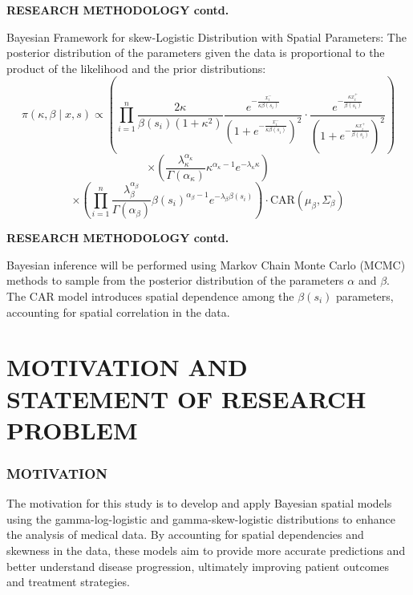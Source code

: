 \documentclass{beamer}
\begin{document}
\begin{frame}{\textbf{RESEARCH METHODOLOGY contd.}}

Bayesian Framework for skew-Logistic Distribution with Spatial Parameters: The posterior distribution of the parameters given the data is proportional to the product of the likelihood and the prior distributions:
\[
\pi(\kappa, \beta \mid x, s) \propto \left( \prod_{i=1}^{n} \frac{2\kappa}{\beta(s_i)(1 + \kappa^2)} \frac{e^{-\frac{x^-_i}{\kappa \beta(s_i)}}}{(1 + e^{-\frac{x^-_i}{\kappa \beta(s_i)}})^2} \cdot \frac{e^{-\frac{\kappa x^+_i}{\beta(s_i)}}}{(1 + e^{-\frac{\kappa x^+_i}{\beta(s_i)}})^2} \right)
\]
\[
\times \left( \frac{\lambda_{\kappa}^{\alpha_{\kappa}}}{\Gamma(\alpha_{\kappa})} \kappa^{\alpha_{\kappa} - 1} e^{-\lambda_{\kappa} \kappa} \right)
\]
\[
\times \left( \prod_{i=1}^{n} \frac{\lambda_{\beta}^{\alpha_{\beta}}}{\Gamma(\alpha_{\beta})} \beta(s_i)^{\alpha_{\beta} - 1} e^{-\lambda_{\beta} \beta(s_i)} \right) \cdot \text{CAR}(\mu_\beta, \Sigma_\beta)
\]


\end{frame}

\begin{frame}{\textbf{RESEARCH METHODOLOGY contd.}}

Bayesian inference will be performed using Markov Chain Monte Carlo (MCMC) methods to sample from the posterior distribution of the parameters \( \alpha \) and \( \beta \). The CAR model introduces spatial dependence among the \( \beta(s_i) \) parameters,  accounting for spatial correlation in the data.

\end{frame}


\section{MOTIVATION AND STATEMENT OF RESEARCH PROBLEM}
\begin{frame}
		\frametitle{\textbf{MOTIVATION}}
		The motivation for this study is to develop and apply Bayesian spatial models using the gamma-log-logistic and gamma-skew-logistic distributions to enhance the analysis of medical data. By accounting for spatial dependencies and skewness in the data, these models aim to provide more accurate predictions and better understand disease progression, ultimately improving patient outcomes and treatment strategies.
	\end{frame}
\end{document}
